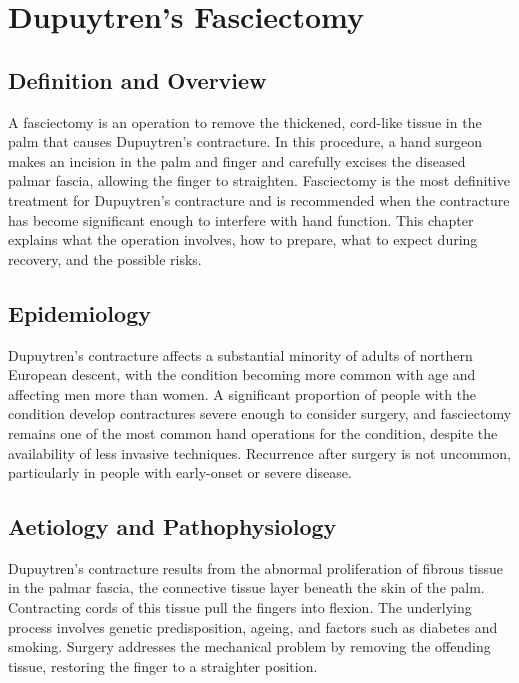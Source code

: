 \chapter{Dupuytren's Fasciectomy}

\section*{Definition and Overview}
A fasciectomy is an operation to remove the thickened, cord-like tissue in the palm that causes Dupuytren's contracture. In this procedure, a hand surgeon makes an incision in the palm and finger and carefully excises the diseased palmar fascia, allowing the finger to straighten. Fasciectomy is the most definitive treatment for Dupuytren's contracture and is recommended when the contracture has become significant enough to interfere with hand function. This chapter explains what the operation involves, how to prepare, what to expect during recovery, and the possible risks.

\section*{Epidemiology}
Dupuytren's contracture affects a substantial minority of adults of northern European descent, with the condition becoming more common with age and affecting men more than women. A significant proportion of people with the condition develop contractures severe enough to consider surgery, and fasciectomy remains one of the most common hand operations for the condition, despite the availability of less invasive techniques. Recurrence after surgery is not uncommon, particularly in people with early-onset or severe disease.

\section*{Aetiology and Pathophysiology}
Dupuytren's contracture results from the abnormal proliferation of fibrous tissue in the palmar fascia, the connective tissue layer beneath the skin of the palm. Contracting cords of this tissue pull the fingers into flexion. The underlying process involves genetic predisposition, ageing, and factors such as diabetes and smoking. Surgery addresses the mechanical problem by removing the offending tissue, restoring the finger to a straighter position.

